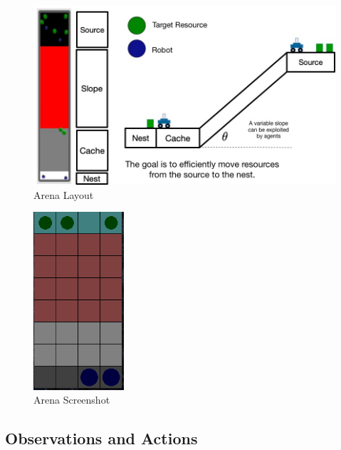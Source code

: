\documentclass[12pt]{article}
\begin{document}
\begin{figure}
	\centering
	\includegraphics[width=\textwidth]{arena.jpg}
	\caption{Arena Layout}
	\label{fig:arena}
\end{figure}

\begin{figure}
	\centering
	\includegraphics[width=0.3\textwidth]{arena_layout.png}
	\caption{Arena Screenshot}
	\label{fig:arena_2}
\end{figure}

\subsection{Observations and Actions}\label{observation_space}
\end{document}
